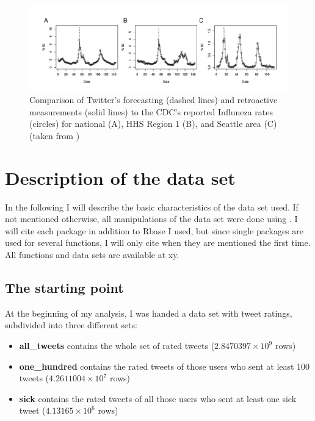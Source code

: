 \documentclass[11pt, a4paper]{article}\usepackage[]{graphicx}\usepackage[]{color}
\begin{document}
\begin{figure}[h]
  \centering
    \includegraphics[width=.9\textwidth]{cdc_fit_bodnar_thesis.png}
  \caption{Comparison of Twitter's forecasting (dashed lines) and retroactive measurements (solid lines) to the CDC's reported Influneza rates (circles) for national (A), HHS Region 1 (B), and Seattle area (C) (taken from \citep{bodnar_data_2015})}
  \label{fig:cdc_fit_bodnar_thesis}
  \end{figure}

\section{Description of the data set}
In the following I will describe the basic characteristics of the data set used. If not mentioned otherwise, all manipulations of the data set were done using . I will cite each package in addition to Rbase I used, but since single packages are used for several functions, I will only cite when they are mentioned the first time. All functions and data sets are available at xy.

\subsection{The starting point}

At the beginning of my analysis, I was handed a data set with tweet ratings, subdivided into three different sets: 

\begin{itemize}
  \item \textbf{all\_tweets} contains the whole set of rated tweets (\ensuremath{2.8470397\times 10^{9}} rows)
  \item \textbf{one\_hundred} contains the rated tweets of those users who sent at least 100 tweets (\ensuremath{4.2611004\times 10^{7}} rows)
  \item \textbf{sick} contains the rated tweets of all those users who sent at least one sick tweet (\ensuremath{4.13165\times 10^{6}} rows)
\end{itemize}
\end{document}
